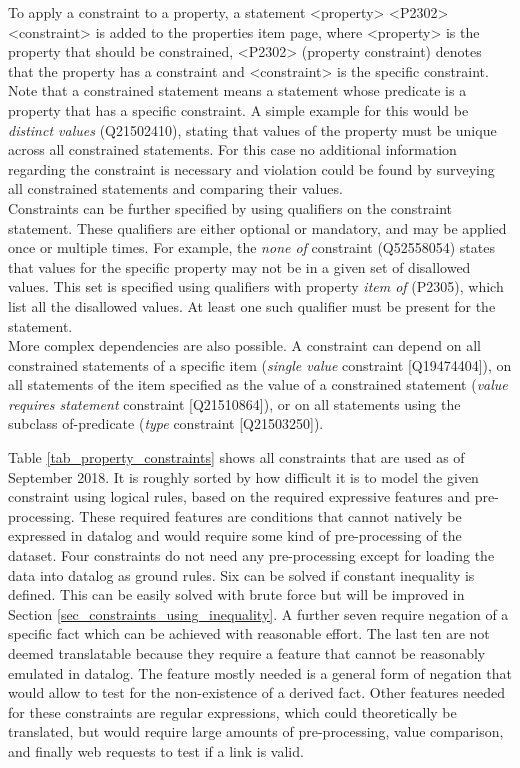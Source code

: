 \documentclass[hyperref,bachelorofscience,fleqn]{cgvpub}
\begin{document}
To apply a constraint to a property, a statement <property> <P2302> <constraint> is added to the properties item page, where <property> is the property that should be constrained, <P2302> (property constraint) denotes that the property has a constraint and <constraint> is the specific constraint. Note that a constrained statement means a statement whose predicate is a property that has a specific constraint. A simple example for this would be \emph{distinct values} (Q21502410), stating that values of the property must be unique across all constrained statements. For this case no additional information regarding the constraint is necessary and violation could be found by surveying all constrained statements and comparing their values.\\
Constraints can be further specified by using qualifiers on the constraint statement. These qualifiers are either optional or mandatory, and may be applied once or multiple times. For example, the \emph{none of} constraint (Q52558054) states that values for the specific property may not be in a given set of disallowed values. This set is specified using qualifiers with property \emph{item of} (P2305), which list all the disallowed values. At least one such qualifier must be present for the statement.\\
More complex dependencies are also possible. A constraint can depend on all constrained statements of a specific item (\emph{single value} constraint [Q19474404]), on all statements of the item specified as the value of a constrained statement (\emph{value requires statement} constraint [Q21510864]), or on all statements using the subclass of-predicate (\emph{type} constraint [Q21503250]).

Table \ref{tab_property_constraints} shows all constraints that are used as of September 2018. It is roughly sorted by how difficult it is to model the given constraint using logical rules, based on the required expressive features and pre-processing. These required features are conditions that cannot natively be expressed in datalog and would require some kind of pre-processing of the dataset. Four constraints do not need any pre-processing except for loading the data into datalog as ground rules. Six can be solved if constant inequality is defined. This can be easily solved with brute force but will be improved in Section \ref{sec_constraints_using_inequality}. A further seven require negation of a specific fact which can be achieved with reasonable effort. The last ten are not deemed translatable because they require a feature that cannot be reasonably emulated in datalog. The feature mostly needed is a general form of negation that would allow to test for the non-existence of a derived fact. Other features needed for these constraints are regular expressions, which could theoretically be translated, but would require large amounts of pre-processing, value comparison, and finally web requests to test if a link is valid.
\end{document}
